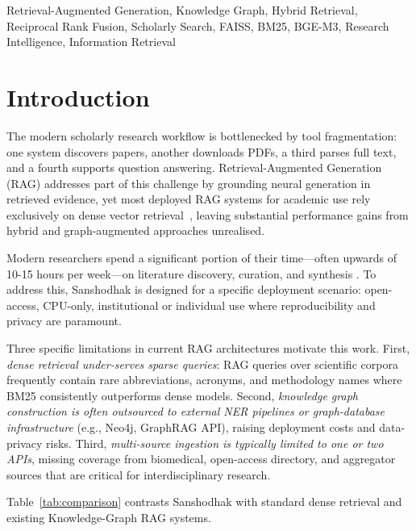 \documentclass[journal]{IEEEtran}
\begin{document}
\begin{IEEEkeywords}
Retrieval-Augmented Generation, Knowledge Graph, Hybrid Retrieval,
Reciprocal Rank Fusion, Scholarly Search, FAISS, BM25, BGE-M3,
Research Intelligence, Information Retrieval
\end{IEEEkeywords}

\section{Introduction}
\label{sec:intro}

The modern scholarly research workflow is bottlenecked by
tool fragmentation: one system discovers papers, another downloads
PDFs, a third parses full text, and a fourth supports question
answering. Retrieval-Augmented Generation (RAG) \cite{lewis2020rag}
addresses part of this challenge by grounding neural generation in
retrieved evidence, yet most deployed RAG systems for academic use
rely exclusively on dense vector retrieval~\cite{johnson2019faiss},
leaving substantial performance gains from hybrid and graph-augmented
approaches unrealised.

Modern researchers spend a significant portion of their time—often upwards of 10-15 hours per week—on literature discovery, curation, and synthesis \cite{tenopir2015scholarly}. To address this, Sanshodhak is designed for a specific deployment scenario: open-access, CPU-only, institutional or individual use where reproducibility and privacy are paramount.

Three specific limitations in current RAG architectures motivate this work. First, \emph{dense retrieval under-serves sparse queries}: RAG queries over scientific corpora frequently contain rare abbreviations, acronyms, and methodology names where BM25 \cite{robertson2009probabilistic} consistently outperforms dense models. Second, \emph{knowledge graph construction is often outsourced to external NER pipelines or graph-database infrastructure} (e.g., Neo4j, GraphRAG API), raising deployment costs and data-privacy risks. Third, \emph{multi-source ingestion is typically limited to one or two APIs}, missing coverage from biomedical, open-access directory, and aggregator sources that are critical for interdisciplinary research.

Table~\ref{tab:comparison} contrasts Sanshodhak with standard dense retrieval and existing Knowledge-Graph RAG systems.
\end{document}
